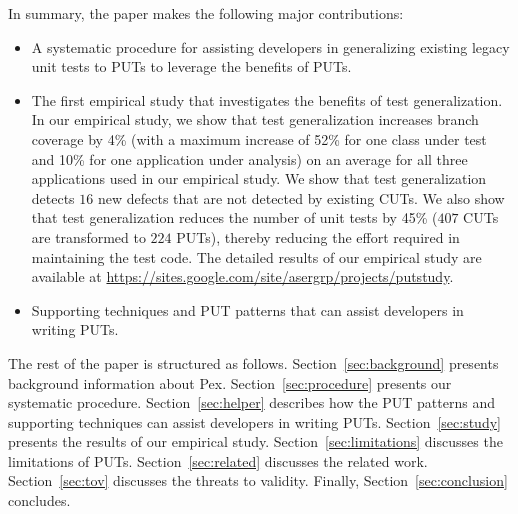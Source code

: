 
In summary, the paper makes the following major contributions:
\begin{itemize}
	\item A systematic procedure for assisting developers in generalizing existing legacy unit tests to PUTs to leverage the benefits of PUTs.
	\item The first empirical study that investigates the benefits of test generalization. In our empirical study, we show that test generalization increases branch coverage by 4\% (with a maximum increase of 52\% for one class under test and 10\% for one application under analysis) on an average for all three applications used in our empirical study. We show that test generalization detects $16$ new defects that are not detected by existing CUTs. We also show that test generalization reduces the number of unit tests by 45\% ($407$ CUTs are transformed to $224$ PUTs), thereby reducing the effort required in maintaining the test code. The detailed results of our empirical study are available at \url{https://sites.google.com/site/asergrp/projects/putstudy}.	
	\item Supporting techniques and PUT patterns that can assist developers in writing PUTs.
\end{itemize}

The rest of the paper is structured as follows. 
Section~\ref{sec:background} presents background information about Pex. Section~\ref{sec:procedure} presents our systematic procedure.  
Section~\ref{sec:helper} describes how the PUT patterns and supporting techniques can assist developers in writing PUTs. 
Section~\ref{sec:study} presents the results of our empirical study. Section~\ref{sec:limitations} discusses the limitations of PUTs. Section~\ref{sec:related} discusses the related work. Section~\ref{sec:tov} discusses the threats to validity. Finally, Section~\ref{sec:conclusion} concludes.

